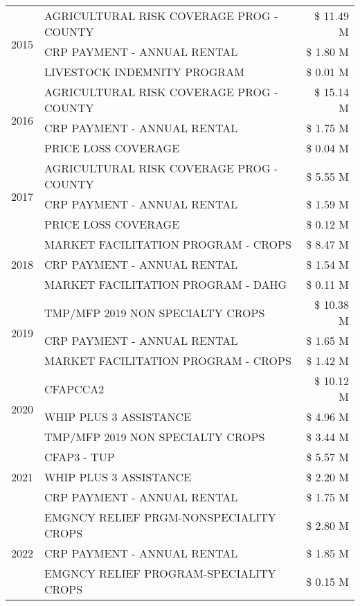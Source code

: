 \begin{tabular}{llr}
\cline{1-3}
\multirow[t]{3}{*}{2015} & AGRICULTURAL RISK COVERAGE PROG - COUNTY & \$ 11.49 M \\
 & CRP PAYMENT - ANNUAL RENTAL & \$ 1.80 M \\
 & LIVESTOCK INDEMNITY PROGRAM & \$ 0.01 M \\
\cline{1-3}
\multirow[t]{3}{*}{2016} & AGRICULTURAL RISK COVERAGE PROG - COUNTY & \$ 15.14 M \\
 & CRP PAYMENT - ANNUAL RENTAL & \$ 1.75 M \\
 & PRICE LOSS COVERAGE & \$ 0.04 M \\
\cline{1-3}
\multirow[t]{3}{*}{2017} & AGRICULTURAL RISK COVERAGE PROG - COUNTY & \$ 5.55 M \\
 & CRP PAYMENT - ANNUAL RENTAL & \$ 1.59 M \\
 & PRICE LOSS COVERAGE & \$ 0.12 M \\
\cline{1-3}
\multirow[t]{3}{*}{2018} & MARKET FACILITATION PROGRAM - CROPS & \$ 8.47 M \\
 & CRP PAYMENT - ANNUAL RENTAL & \$ 1.54 M \\
 & MARKET FACILITATION PROGRAM - DAHG & \$ 0.11 M \\
\cline{1-3}
\multirow[t]{3}{*}{2019} & TMP/MFP 2019 NON SPECIALTY CROPS & \$ 10.38 M \\
 & CRP PAYMENT - ANNUAL RENTAL & \$ 1.65 M \\
 & MARKET FACILITATION PROGRAM - CROPS & \$ 1.42 M \\
\cline{1-3}
\multirow[t]{3}{*}{2020} & CFAPCCA2 & \$ 10.12 M \\
 & WHIP PLUS 3 ASSISTANCE & \$ 4.96 M \\
 & TMP/MFP 2019 NON SPECIALTY CROPS & \$ 3.44 M \\
\cline{1-3}
\multirow[t]{3}{*}{2021} & CFAP3 - TUP & \$ 5.57 M \\
 & WHIP PLUS 3 ASSISTANCE & \$ 2.20 M \\
 & CRP PAYMENT - ANNUAL RENTAL & \$ 1.75 M \\
\cline{1-3}
\multirow[t]{3}{*}{2022} & EMGNCY RELIEF PRGM-NONSPECIALITY CROPS & \$ 2.80 M \\
 & CRP PAYMENT - ANNUAL RENTAL & \$ 1.85 M \\
 & EMGNCY RELIEF PROGRAM-SPECIALITY CROPS & \$ 0.15 M \\
\cline{1-3}
\bottomrule
\end{tabular}
